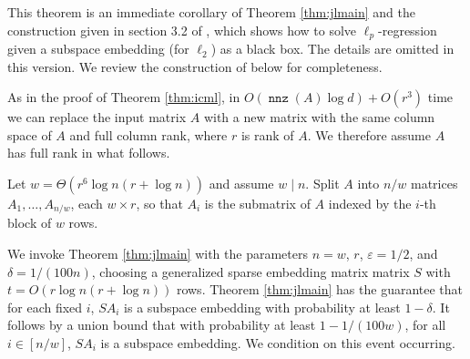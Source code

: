 \documentclass{sig-alternate}
\DeclareMathOperator{\nnz}{\mathtt{nnz}}
\newcommand{\eps}{\varepsilon}
\begin{document}
This theorem is an immediate corollary of Theorem \ref{thm:jlmain} 
and the construction given in 
section 3.2 of \cite{CDMMMW}, which shows how to solve $\ell_p$-regression given a subspace embedding
(for $\ell_2$) as a black box.
\ifSTOC
The details are omitted in this version.
\else
We review the construction of \cite{CDMMMW} below for completeness. 

As in the proof of Theorem \ref{thm:icml}, in $O(\nnz(A) \log d) + O(r^3)$ time we can 
replace the input matrix $A$ with a new matrix with the same column space of $A$ and 
full column rank,
where $r$ is rank of $A$. We therefore assume $A$ has full rank in what follows. 

Let $w = \Theta(r^6 \log n (r + \log n))$ and assume $w \mid n$. 
Split $A$ into $n/w$ matrices $A_1, \ldots, A_{n/w}$,
each $w \times r$, so that $A_i$ is the submatrix of $A$ indexed by the $i$-th block of 
$w$ rows. 

We invoke Theorem \ref{thm:jlmain} with the parameters $n = w$, $r$, $\eps = 1/2$, 
and $\delta = 1/(100n)$, choosing a generalized sparse embedding matrix matrix $S$ with 
$t = O(r \log n(r + \log n))$ rows. Theorem \ref{thm:jlmain} has the guarantee that for each fixed $i$,
$SA_i$ is a subspace embedding with probability at least $1-\delta$. It follows by a union
bound that with probability at least $1- 1/(100w)$, for all $i \in [n/w]$, $SA_i$ 
is a subspace embedding. We condition on this event occurring. 
\end{document}
